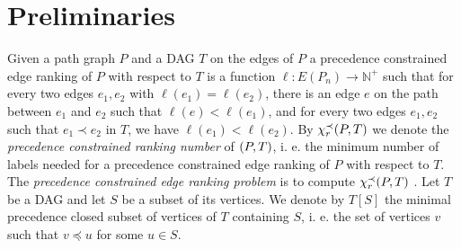 \section{Preliminaries}
\label{sec:preliminaries}

Given a path graph $P$ and a DAG $T$ on the edges of $P$ a precedence constrained edge ranking of $P$ with respect to $T$ is a function $\ell\colon E(P_n) \to \mathbb{N^+}$ such that for every two edges $e_1,e_2$ with $\ell(e_1)=\ell(e_2)$, there is an edge $e$ on the path between $e_1$ and $e_2$ such that $\ell(e)<\ell(e_1)$, and for every two edges $e_1,e_2$ such that $e_1 \prec e_2$ in $T$, we have $\ell(e_1)<\ell(e_2)$. By $\chi_r^{\prec}(P,T)$ we denote the \emph{precedence constrained ranking number} of $\mathopen{}\left( P,T \right)$, i. e. the minimum number of labels needed for a precedence constrained edge ranking of $P$ with respect to $T$.
The \emph{precedence constrained edge ranking problem} is to compute $\chi_r^{\prec}(P,T)$
. Let $T$ be a DAG and let $S$ be a subset of its vertices. We denote by $T[S]$ the minimal precedence closed subset of vertices of $T$ containing $S$, i. e. the set of vertices $v$ such that $v\preceq u$ for some $u\in S$. 